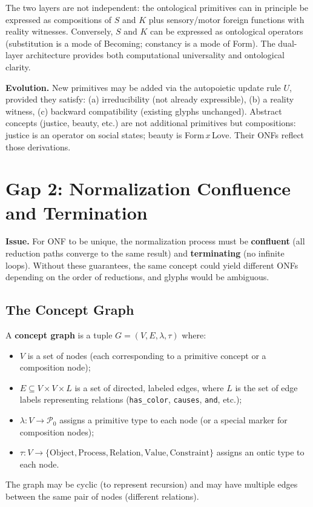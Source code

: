 \documentclass[12pt, letterpaper]{book}
\def\otimes{x}%
\begin{document}
The two layers are not independent: the ontological primitives can in principle be expressed as compositions of $S$ and $K$ plus sensory/motor foreign functions with reality witnesses. Conversely, $S$ and $K$ can be expressed as ontological operators (substitution is a mode of Becoming; constancy is a mode of Form). The dual-layer architecture provides both computational universality and ontological clarity.

\textbf{Evolution.} New primitives may be added via the autopoietic update rule $U$, provided they satisfy: (a) irreducibility (not already expressible), (b) a reality witness, (c) backward compatibility (existing glyphs unchanged). Abstract concepts (justice, beauty, etc.) are not additional primitives but compositions: justice is an operator on social states; beauty is Form$\,\otimes\,$Love. Their ONFs reflect those derivations.

\section{Gap 2: Normalization Confluence and Termination}

\textbf{Issue.} For ONF to be unique, the normalization process must be \textbf{confluent} (all reduction paths converge to the same result) and \textbf{terminating} (no infinite loops). Without these guarantees, the same concept could yield different ONFs depending on the order of reductions, and glyphs would be ambiguous.

\subsection{The Concept Graph}

A \textbf{concept graph} is a tuple $G = (V, E, \lambda, \tau)$ where:
\begin{itemize}
    \item $V$ is a set of nodes (each corresponding to a primitive concept or a composition node);
    \item $E \subseteq V \times V \times L$ is a set of directed, labeled edges, where $L$ is the set of edge labels representing relations (\texttt{has\_color}, \texttt{causes}, \texttt{and}, etc.);
    \item $\lambda: V \to \mathcal{P}_0$ assigns a primitive type to each node (or a special marker for composition nodes);
    \item $\tau: V \to \{\mathrm{Object}, \mathrm{Process}, \mathrm{Relation}, \mathrm{Value}, \mathrm{Constraint}\}$ assigns an ontic type to each node.
\end{itemize}
The graph may be cyclic (to represent recursion) and may have multiple edges between the same pair of nodes (different relations).
\end{document}
